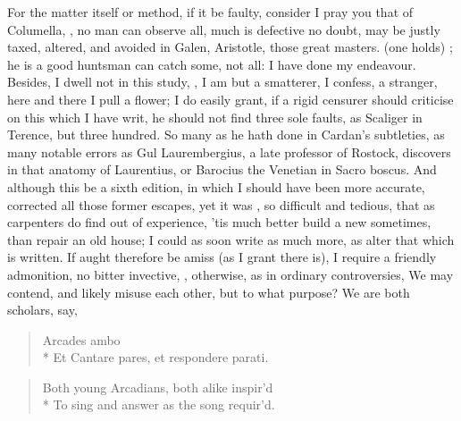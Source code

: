 {For the matter itself or method, if it be faulty, consider I pray you
that of Columella, , no man can observe all, much is defective no doubt, may be
justly taxed, altered, and avoided in Galen, Aristotle, those great
masters.  (one holds) ; he is a good huntsman can catch some, not all: I have done my
endeavour. Besides, I dwell not in this study, , I am but a smatterer, I confess, a stranger,
here and there I pull a flower; I do easily grant, if a rigid
censurer should criticise on this which I have writ, he should not find
three sole faults, as Scaliger in Terence, but three hundred. So many
as he hath done in Cardan's subtleties, as many notable errors as
Gul Laurembergius, a late professor of Rostock, discovers in that
anatomy of Laurentius, or Barocius the Venetian in Sacro boscus. And
although this be a sixth edition, in which I should have been more
accurate, corrected all those former escapes, yet it was , so difficult and tedious, that as carpenters do find out of
experience, 'tis much better build a new sometimes, than repair an old
house; I could as soon write as much more, as alter that which is
written. If aught therefore be amiss (as I grant there is), I require a
friendly admonition, no bitter invective, , otherwise, as in ordinary controversies,
 We may contend, and likely
misuse each other, but to what purpose? We are both scholars, say,

\begin{latin}
\begin{verse}
Arcades ambo\\*
Et Cantare pares, et respondere parati.
\end{verse}
\end{latin}
\translationrule
\begin{verse}
Both young Arcadians, both alike inspir'd\\*
To sing and answer as the song requir'd.
\end{verse}
%

}
